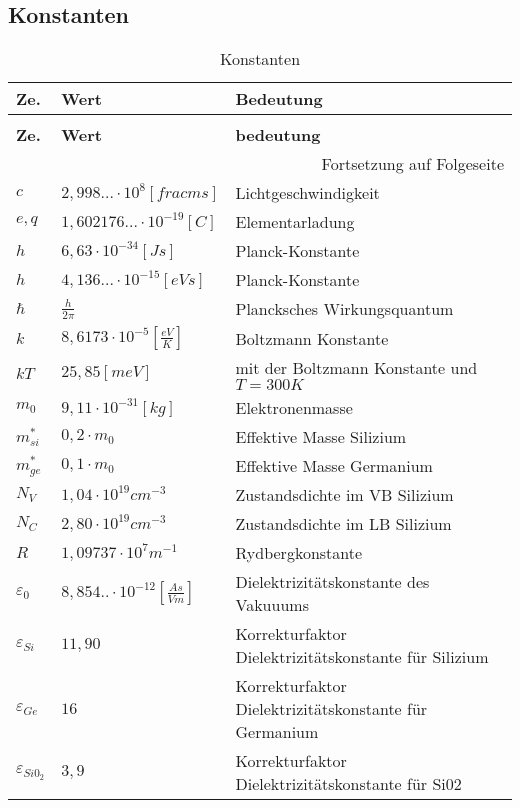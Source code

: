 \documentclass[12pt,a4paper]{article}%
\numberwithin{equation}{section}
\def\bracks#1{\left[ #1 \right]}
\numberwithin{equation}{subsection}
\begin{document}
	\subsection{Konstanten} \label{ch:constants}
	\renewcommand{\arraystretch}{1.5}
	
	\begin{longtable} {|p{0.6cm}|p{4.4cm}|p{8.4cm}|} \hline
	\textbf{Ze.} & \textbf{Wert} & \textbf{Bedeutung}\\
	\hline
	\endfirsthead %
	\caption{Konstanten}\\ \hline
	\textbf{Ze.} & \textbf{Wert} & \textbf{bedeutung}\\
	\hline
	\endhead %
	\multicolumn{3}{r}{Fortsetzung auf Folgeseite}\\
	\endfoot
	\hline
	\endlastfoot
	
	$c$ & $2,998...\cdot 10^8 \bracks{frac{m}{s}}$ & Lichtgeschwindigkeit\\ \hline
	$e,q$ & $1,602176...\cdot 10^{-19}\bracks{C}$ & Elementarladung\\ \hline
	$h$ & $6,63 \cdot 10^{-34} \bracks{Js}$ & Planck-Konstante\\ \hline
	$h$ & $4,136...\cdot 10^{-15} \bracks{eVs}$ & Planck-Konstante\\ \hline
	$\hbar$ & $\frac{h}{2\pi}$ & Plancksches Wirkungsquantum\\ \hline
	$k$ & $8,6173 \cdot 10^{-5} \bracks{\frac{eV}{K}}$ & Boltzmann Konstante\\ \hline
	$kT$ & $25,85 \bracks{meV}$ & mit der Boltzmann Konstante und $T=300K$ \\ \hline
	$m_0$ & $9,11 \cdot 10^{-31} \bracks{kg}$ & Elektronenmasse\\ \hline
	$m^*_{si}$ & $0,2 \cdot m_0$ & Effektive Masse Silizium \\ \hline
	$m^*_{ge}$ & $0,1 \cdot m_0$ & Effektive Masse Germanium \\ \hline
	$N_V$ & $1,04\cdot 10^{19}cm^{-3}$ & Zustandsdichte im VB Silizium \\ \hline
	$N_C$ & $2,80\cdot 10^{19}cm^{-3}$ & Zustandsdichte im LB Silizium \\ \hline
	$R$ & $1,09737 \cdot 10^7 m^{-1} $ & Rydbergkonstante\\ \hline
	
	$\varepsilon_0$ & $8,854..\cdot 10^{-12}\bracks{\frac{As}{Vm}}$ & Dielektrizitätskonstante des Vakuuums \\ \hline
	$\varepsilon_{Si}$ & $11,90$ & Korrekturfaktor Dielektrizitätskonstante für Silizium\\ \hline
	$\varepsilon_{Ge}$ & $16$ & Korrekturfaktor Dielektrizitätskonstante für Germanium\\ \hline
	$\varepsilon_{Si0_2}$ & $3,9$ & Korrekturfaktor Dielektrizitätskonstante für Si02\\ \hline
	\end{longtable}
	\renewcommand{\arraystretch}{1}
  
\end{document}
